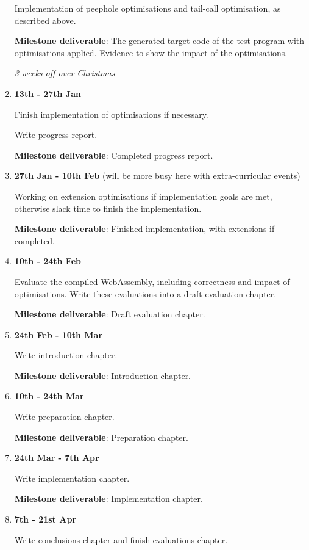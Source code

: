 \begin{enumerate}
  Implementation of peephole optimisations and tail-call optimisation, as described above.

  \textbf{Milestone deliverable}: The generated target code of the test program with optimisations applied. Evidence to show the impact of the optimisations.

\textit{3 weeks off over Christmas}

\item\textbf{13th - 27th Jan}

  Finish implementation of optimisations if necessary.

  Write progress report.

  \textbf{Milestone deliverable}: Completed progress report.

\item \textbf{27th Jan - 10th Feb} (will be more busy here with extra-curricular events)

  Working on extension optimisations if implementation goals are met, otherwise slack time to finish the implementation.

  \textbf{Milestone deliverable}: Finished implementation, with extensions if completed.

\item\textbf{10th - 24th Feb}

  Evaluate the compiled WebAssembly, including correctness and impact of optimisations. Write these evaluations into a draft evaluation chapter.

  \textbf{Milestone deliverable}: Draft evaluation chapter.

\item\textbf{24th Feb - 10th Mar}

  Write introduction chapter.

  \textbf{Milestone deliverable}: Introduction chapter.

\item\textbf{10th - 24th Mar}

  Write preparation chapter.

  \textbf{Milestone deliverable}: Preparation chapter.

\item\textbf{24th Mar - 7th Apr}

  Write implementation chapter.

  \textbf{Milestone deliverable}: Implementation chapter.

\item\textbf{7th - 21st Apr}

  Write conclusions chapter and finish evaluations chapter.


\end{enumerate}
